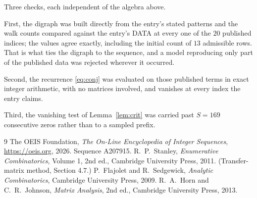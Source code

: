 \documentclass[11pt,a4paper]{article}
\theoremstyle{plain}
\theoremstyle{definition}
\begin{document}
Three checks, each independent of the algebra above.

First, the digraph was built directly from the entry's stated patterns and the walk counts
compared against the entry's DATA at every one of the $20$ published indices; the
values agree exactly, including the initial count of $13$ admissible rows. That is
what ties the digraph to the sequence, and a model reproducing only part of the published
data was rejected wherever it occurred.

Second, the recurrence \eqref{eq:conj} was evaluated on those published terms in exact
integer arithmetic, with no matrices involved, and vanishes at every index the entry claims.

Third, the vanishing test of Lemma~\ref{lem:crit} was carried past $S=169$ consecutive
zeros rather than to a sampled prefix.

\begin{thebibliography}{9}
 The OEIS Foundation, \emph{The On-Line Encyclopedia of Integer
Sequences}, \url{https://oeis.org}, 2026. Sequence A207915.
 R.~P.~Stanley, \emph{Enumerative Combinatorics}, Volume 1, 2nd ed.,
Cambridge University Press, 2011. (Transfer-matrix method, Section 4.7.)
 P.~Flajolet and R.~Sedgewick, \emph{Analytic Combinatorics}, Cambridge
University Press, 2009.
 R.~A.~Horn and C.~R.~Johnson, \emph{Matrix Analysis}, 2nd ed., Cambridge
University Press, 2013.
\end{thebibliography}
\end{document}
